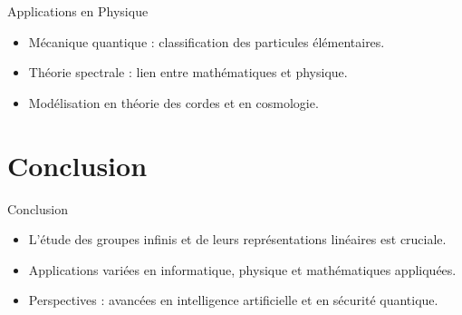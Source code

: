 \documentclass[french]{beamer}
\begin{document}
	\begin{frame}{Applications en Physique}
		\begin{itemize}
			\item Mécanique quantique : classification des particules élémentaires.
			\item Théorie spectrale : lien entre mathématiques et physique.
			\item Modélisation en théorie des cordes et en cosmologie.
		\end{itemize}
	\end{frame}
	
	\section{Conclusion}
	\begin{frame}{Conclusion}
		\begin{itemize}
			\item L’étude des groupes infinis et de leurs représentations linéaires est cruciale.
			\item Applications variées en informatique, physique et mathématiques appliquées.
			\item Perspectives : avancées en intelligence artificielle et en sécurité quantique.
		\end{itemize}
	\end{frame}
	
\end{document}
